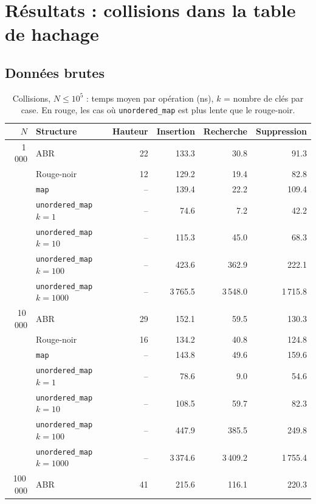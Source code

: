 \documentclass[12pt,a4paper]{report}
\newcommand{\bad}{\cellcolor{ko}}
\begin{document}
\chapter{Résultats : collisions dans la table de hachage}

\section{Données brutes}
\begin{table}[H]
\centering
\caption{Collisions, $N \le 10^5$ : temps moyen par opération (ns), $k$ = nombre de clés par case. En rouge, les cas où \texttt{unordered\_map} est plus lente que le rouge-noir.}
\small
\begin{tabular}{rlrrrr}
  \toprule
  $N$ & Structure & Hauteur & Insertion & Recherche & Suppression \\
  \midrule
  1\,000 & ABR & 22 & 133.3 & 30.8 & 91.3 \\
         & Rouge-noir & 12 & 129.2 & 19.4 & 82.8 \\
         & \texttt{map} & -- & 139.4 & 22.2 & 109.4 \\
         & \texttt{unordered\_map} $k=1$ & -- & 74.6 & 7.2 & 42.2 \\
         & \texttt{unordered\_map} $k=10$ & -- & 115.3 & \bad 45.0 & 68.3 \\
         & \texttt{unordered\_map} $k=100$ & -- & \bad 423.6 & \bad 362.9 & \bad 222.1 \\
         & \texttt{unordered\_map} $k=1000$ & -- & \bad 3\,765.5 & \bad 3\,548.0 & \bad 1\,715.8 \\
  \midrule
  10\,000 & ABR & 29 & 152.1 & 59.5 & 130.3 \\
          & Rouge-noir & 16 & 134.2 & 40.8 & 124.8 \\
          & \texttt{map} & -- & 143.8 & 49.6 & 159.6 \\
          & \texttt{unordered\_map} $k=1$ & -- & 78.6 & 9.0 & 54.6 \\
          & \texttt{unordered\_map} $k=10$ & -- & 108.5 & \bad 59.7 & 82.3 \\
          & \texttt{unordered\_map} $k=100$ & -- & \bad 447.9 & \bad 385.5 & \bad 249.8 \\
          & \texttt{unordered\_map} $k=1000$ & -- & \bad 3\,374.6 & \bad 3\,409.2 & \bad 1\,755.4 \\
  \midrule
  100\,000 & ABR & 41 & 215.6 & 116.1 & 220.3 \\

\end{tabular}
\end{table}
\end{document}
